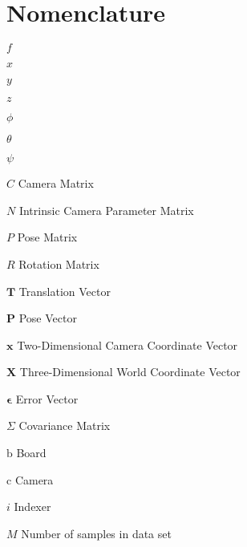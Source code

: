 \chapter{Nomenclature}

\begin{Nomencl}[2cm]

   \item[$f$]	      
   \item[$x$]         
   \item[$y$]         
   \item[$z$]         
   \item[$\phi$]      
   \item[$\theta$]    
   \item[$\psi$]      \\

   \item[$C$]		Camera Matrix
   \item[$N$]		Intrinsic Camera Parameter Matrix
   \item[$P$]		Pose Matrix
   \item[$R$]		Rotation Matrix
   \item[$\bm{T}$]	Translation Vector
   \item[$\bm{P}$]	Pose Vector
   \item[$\bm{x}$]	Two-Dimensional Camera Coordinate Vector
   \item[$\bm{X}$]	Three-Dimensional World Coordinate Vector
   \item[$\bm{\epsilon}$]	Error Vector
   \item[$\Sigma$] 	Covariance Matrix

   \item[$\mathrm{b}$]          Board
   \item[$\mathrm{c}$] 		Camera
   \item[$i$]			Indexer
   \item[$M$]			Number of samples in data set


\end{Nomencl}
